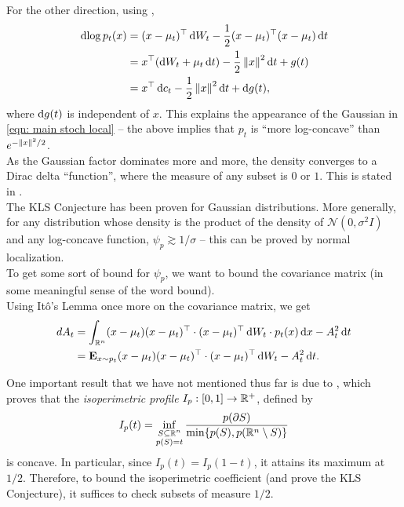 		For the other direction, using ,
		\begin{align*}
			\d{\log p_t(x)} &= (x-\mu_t)^\top \d{W}_t - \frac{1}{2} (x-\mu_t)^\top (x-\mu_t) \d{t} \\
				&= x^\top (\d{W}_t + \mu_t\d{t}) - \frac{1}{2}\norm{x}^2\d{t} + g(t) \\
				&= x^\top\d{c}_t - \frac{1}{2}\norm{x}^2\d{t} + \d{g}(t),
		\end{align*}
		where $\operatorname{d}\!{g}(t)$ is independent of $x$. This explains the appearance of the Gaussian in \eqref{eqn: main stoch local} -- the above implies that $p_t$ is ``more log-concave'' than $e^{-\left\lVert x\right\rVert^2/2}$.\\
		As the Gaussian factor dominates more and more, the density converges to a Dirac delta ``function'', where the measure of any subset is $0$ or $1$. This is stated in .\\

		The KLS Conjecture has been proven for Gaussian distributions. More generally, for any distribution whose density is the product of the density of $\mathcal{N}(0,\sigma^2 I)$ and any log-concave function, $\psi_p \gtrsim 1/\sigma$ -- this can be proved by normal localization.\\
		
		To get some sort of bound for $\psi_p$, we want to bound the covariance matrix (in some meaningful sense of the word bound).\\
		Using It\^{o}'s Lemma once more on the covariance matrix, we get 
		\begin{align}
			d{A}_t &= \int_{\mathbb{R}^n} (x-\mu_t)(x-\mu_t)^\top \cdot (x-\mu_t)^\top\operatorname{d}\!{W}_t \cdot p_t(x) \operatorname{d}\!{x} - A_t^2 \operatorname{d}\!{t} \nonumber \\
				&= \textbf{E}_{x \sim p_t} (x-\mu_t)(x-\mu_t)^\top \cdot (x-\mu_t)^\top\operatorname{d}\!{W}_t - A_t^2 \operatorname{d}\!{t}. \label{eqn: dAt expression}
		\end{align}

		One important result that we have not mentioned thus far is due to \cite{milman2008isoperimetricprofile}, which proves that the \textit{isoperimetric profile} $I_p : [0,1]\to\mathbb{R}^+$, defined by
		\[ I_p(t) = \inf_{\substack{S\subseteq\mathbb{R}^n \\ p(S) = t}} \frac{p(\partial S)}{\min\{p(S),p(\mathbb{R}^n\setminus S)\}} \]
		is concave. In particular, since $I_p(t) = I_p(1-t)$, it attains its maximum at $1/2$. Therefore, to bound the isoperimetric coefficient (and prove the KLS Conjecture), it suffices to check subsets of measure $1/2$.\\

